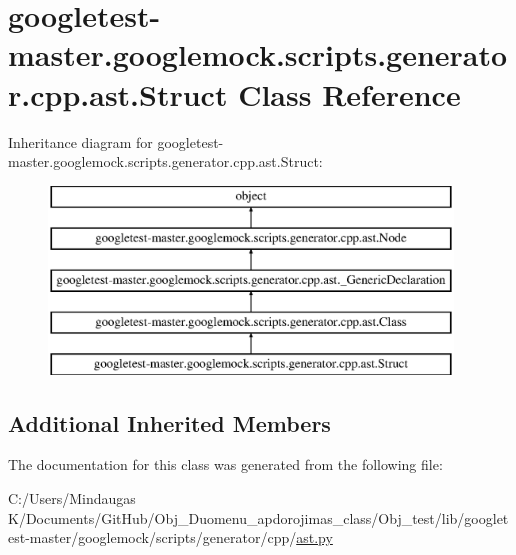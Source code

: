 \hypertarget{classgoogletest-master_1_1googlemock_1_1scripts_1_1generator_1_1cpp_1_1ast_1_1_struct}{}\section{googletest-\/master.googlemock.\+scripts.\+generator.\+cpp.\+ast.\+Struct Class Reference}
\label{classgoogletest-master_1_1googlemock_1_1scripts_1_1generator_1_1cpp_1_1ast_1_1_struct}
Inheritance diagram for googletest-\/master.googlemock.\+scripts.\+generator.\+cpp.\+ast.\+Struct\+:\begin{figure}[H]
\begin{center}
\leavevmode
\includegraphics[height=5.000000cm]{de/d0b/classgoogletest-master_1_1googlemock_1_1scripts_1_1generator_1_1cpp_1_1ast_1_1_struct}
\end{center}
\end{figure}
\subsection*{Additional Inherited Members}


The documentation for this class was generated from the following file\+:\begin{DoxyCompactItemize}
\item 
C\+:/\+Users/\+Mindaugas K/\+Documents/\+Git\+Hub/\+Obj\+\_\+\+Duomenu\+\_\+apdorojimas\+\_\+class/\+Obj\+\_\+test/lib/googletest-\/master/googlemock/scripts/generator/cpp/\mbox{\hyperlink{_obj__test_2lib_2googletest-master_2googlemock_2scripts_2generator_2cpp_2ast_8py}{ast.\+py}}\end{DoxyCompactItemize}
